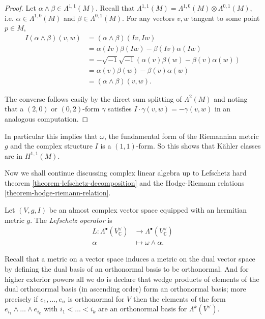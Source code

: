 \begin{proof}
Let $\alpha\wedge\beta \in \Lambda^{1,1}(M)$.
Recall that $\Lambda^{1,1}(M)=\Lambda^{1,0}(M)\otimes\Lambda^{0,1}(M)$,
i.e. $\alpha \in \Lambda^{1,0}(M)$ and
$\beta \in \Lambda^{0,1}(M)$.
For any vectors $v,w$ tangent to some point $p \in M$,
\begin{align*}
I(\alpha\wedge\beta)(v,w)
&=(\alpha\wedge\beta)(Iv,Iw)\\
&=\alpha(Iv)\beta(Iw)-\beta(Iv)\alpha(Iw)\\
&=-\sqrt{-1}\sqrt{-1}(\alpha(v)\beta(w)-\beta(v)\alpha(w))\\
&=\alpha(v)\beta(w)-\beta(v)\alpha(w)\\
&=(\alpha\wedge\beta)(v,w).
\end{align*}

\noindent
The converse follows easily by the direct sum
splitting of $\Lambda^2(M)$ and noting that
a $(2,0)$ or $(0,2)$-form $\gamma$ 
satisfies $I\cdot\gamma(v,w)=-\gamma(v,w)$ 
in an analogous computation.
\end{proof}

\noindent
In particular this implies that $\omega$,
the fundamental form of the Riemannian metric $g$ 
and the complex structure $I$ is a $(1,1)$-form.
So this shows that Kähler classes are in $H^{1,1}(M)$.






\noindent
Now we shall continue discussing complex linear algebra up
to Lefschetz hard theorem \ref{theorem-lefschetz-decomposition}
and the Hodge-Riemann relations \ref{theorem-hodge-riemann-relation}.


\begin{definition}
\label{definition-lefschetz-operator}
Let $(V,g,I)$ be an almost complex vector space 
equipped with an hermitian metric $g$.
The {\it Lefschetz operator} is
\begin{align*}
L: \Lambda^\bullet(V_{\mathbb{C}}^\vee) &\longrightarrow 
\Lambda^\bullet(V_{\mathbb{C}}^\vee) \\
\alpha &\longmapsto \omega\wedge\alpha.
\end{align*}
\end{definition}

\noindent
Recall that a metric on a vector space
induces a metric on the dual vector space
by defining the dual basis of an orthonormal basis
to be orthonormal.
And for higher exterior powers all we do is
declare that wedge products of elements of the dual orthonormal basis
(in ascending order)
form an orthonormal basis; more precisely
if $e_1,…,e_n$ is orthonormal for $V$ then the elements of the form
$e_{i_1}\wedge…\wedge e_{i_k}$ with $i_1<…<i_k$
are an orthonormal basis for $\Lambda^k(V^\vee)$.

